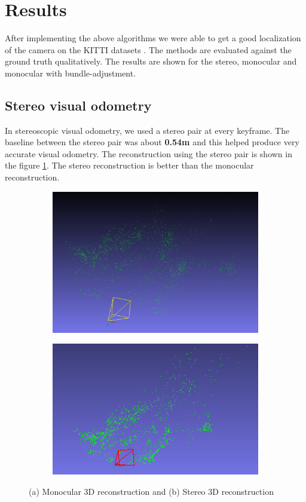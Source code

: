 \documentclass{article}
\begin{document}
\section{Results}
After implementing the above algorithms we were able to get a good localization of the camera on the KITTI datasets \citep{kitti}. The methods are evaluated against the ground truth qualitatively. The results are shown for the stereo, monocular and monocular with bundle-adjustment.

\subsection{Stereo visual odometry}
In stereoscopic visual odometry, we used a stereo pair at every keyframe. The baseline between the stereo pair was about \textbf{0.54m} and this helped produce very accurate visual odometry. The reconstruction using the stereo pair is shown in the figure \ref{fig:reconstruction}. The stereo reconstruction is better than the monocular reconstruction.

\begin{figure}
\begin{subfigure}{0.5\textwidth}
\centering
\includegraphics[height=0.5\textwidth]{./mono_reconstruction}
\end{subfigure}
\begin{subfigure}{0.5\textwidth}
\centering
\includegraphics[height=0.5\textwidth]{./stereo_reconstruction}
\end{subfigure}
\caption{(a) Monocular 3D reconstruction and (b) Stereo 3D reconstruction}
\label{fig:reconstruction}
\end{figure}
\end{document}

